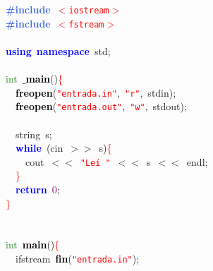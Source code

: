 
{\ttfamily \raggedright {
\noindent
\mbox{}\textbf{\textcolor{RoyalBlue}{\#include}}\ \texttt{\textcolor{Red}{$<$iostream$>$}} \\
\mbox{}\textbf{\textcolor{RoyalBlue}{\#include}}\ \texttt{\textcolor{Red}{$<$fstream$>$}} \\
\mbox{} \\
\mbox{}\textbf{\textcolor{Blue}{using}}\ \textbf{\textcolor{Blue}{namespace}}\ std\textcolor{BrickRed}{;} \\
\mbox{} \\
\mbox{}\textcolor{ForestGreen}{int}\ \textbf{\textcolor{Black}{$\_$main}}\textcolor{BrickRed}{()}\textcolor{Red}{\{} \\
\mbox{}\ \ \textbf{\textcolor{Black}{freopen}}\textcolor{BrickRed}{(}\texttt{\textcolor{Red}{"{}entrada.in"{}}}\textcolor{BrickRed}{,}\ \texttt{\textcolor{Red}{"{}r"{}}}\textcolor{BrickRed}{,}\ stdin\textcolor{BrickRed}{);} \\
\mbox{}\ \ \textbf{\textcolor{Black}{freopen}}\textcolor{BrickRed}{(}\texttt{\textcolor{Red}{"{}entrada.out"{}}}\textcolor{BrickRed}{,}\ \texttt{\textcolor{Red}{"{}w"{}}}\textcolor{BrickRed}{,}\ stdout\textcolor{BrickRed}{);} \\
\mbox{} \\
\mbox{}\ \ string\ s\textcolor{BrickRed}{;} \\
\mbox{}\ \ \textbf{\textcolor{Blue}{while}}\ \textcolor{BrickRed}{(}cin\ \textcolor{BrickRed}{$>$$>$}\ s\textcolor{BrickRed}{)}\textcolor{Red}{\{} \\
\mbox{}\ \ \ \ cout\ \textcolor{BrickRed}{$<$$<$}\ \texttt{\textcolor{Red}{"{}Leí\ "{}}}\ \textcolor{BrickRed}{$<$$<$}\ s\ \textcolor{BrickRed}{$<$$<$}\ endl\textcolor{BrickRed}{;} \\
\mbox{}\ \ \textcolor{Red}{\}} \\
\mbox{}\ \ \textbf{\textcolor{Blue}{return}}\ \textcolor{Purple}{0}\textcolor{BrickRed}{;} \\
\mbox{}\textcolor{Red}{\}} \\
\mbox{} \\
\mbox{} \\
\mbox{}\textcolor{ForestGreen}{int}\ \textbf{\textcolor{Black}{main}}\textcolor{BrickRed}{()}\textcolor{Red}{\{} \\
\mbox{}\ \ ifstream\ \textbf{\textcolor{Black}{fin}}\textcolor{BrickRed}{(}\texttt{\textcolor{Red}{"{}entrada.in"{}}}\textcolor{BrickRed}{);} \\
}}
